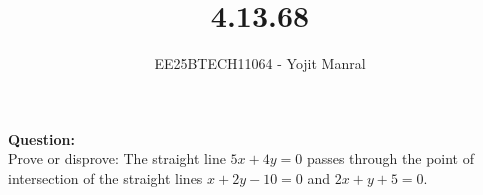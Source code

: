\documentclass[journal]{IEEEtran}
\begin{document}

\vspace{3cm}

\title{4.13.68}
\author{EE25BTECH11064 - Yojit Manral}

\maketitle
{\let\newpage\relax\maketitle}
\renewcommand{\thefigure}{\theenumi}
\renewcommand{\thetable}{\theenumi}
\setlength{\intextsep}{10pt} %

\textbf{Question:}\\
Prove or disprove: The straight line $5x + 4y = 0$ passes through the point of intersection of the straight lines $x + 2y - 10 = 0$ and $2x + y + 5 = 0$.
\end{document}
